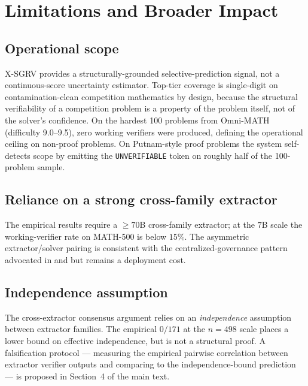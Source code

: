 \documentclass{article}
\begin{document}
\section{Limitations and Broader Impact}
\label{app:impact}

\subsection{Operational scope}

X-SGRV provides a structurally-grounded selective-prediction signal,
not a continuous-score uncertainty estimator. Top-tier coverage is
single-digit on contamination-clean competition mathematics by design,
because the structural verifiability of a competition problem is a
property of the problem itself, not of the solver's confidence. On
the hardest 100 problems from Omni-MATH (difficulty 9.0--9.5), zero
working verifiers were produced, defining the operational ceiling on
non-proof problems. On Putnam-style proof problems the system
self-detects scope by emitting the \texttt{UNVERIFIABLE} token on
roughly half of the 100-problem sample.

\subsection{Reliance on a strong cross-family extractor}

The empirical results require a $\geq 70$B cross-family extractor;
at the $7$B scale the working-verifier rate on MATH-500 is below
$15\%$. The asymmetric extractor/solver pairing is consistent with
the centralized-governance pattern advocated in
\citet{ste2024} and \citet{xiong2024llmuncertainty} but remains a
deployment cost.

\subsection{Independence assumption}

The cross-extractor consensus argument relies on an
\emph{independence} assumption between extractor families. The
empirical $0/171$ at the $n{=}498$ scale places a lower bound on
effective independence, but is not a structural proof. A
falsification protocol --- measuring the empirical pairwise
correlation between extractor verifier outputs and comparing to the
independence-bound prediction --- is proposed in
Section~4 of the main text.
\end{document}

